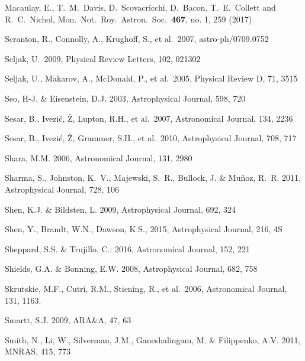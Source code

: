 \documentclass[twocolumn]{aastex61}
\begin{document}
\begin{thebibliography}{}
 Macaulay, E., T.~M.~Davis, D.~Scovacricchi, D.~Bacon, T.~E.~Collett and R.~C.~Nichol, Mon.\ Not.\ Roy.\ Astron.\ Soc.\  {\bf 467}, no. 1, 259 (2017)

 Scranton, R., Connolly, A., Krughoff, S., et al.~2007, astro-ph/0709.0752

 Seljak, U.\ 2009, Physical Review Letters, 102, 021302

 Seljak, U., Makarov, A., McDonald, P., et al.~2005,  Physical Review D, 71, 3515

 Seo, H-J. \& Eisenstein, D.J. 2003, Astrophysical Journal, 598, 720

 Sesar, B., Ivezi\'{c}, \v{Z}, Lupton, R.H., et al.~2007, Astronomical Journal, 134, 2236

 Sesar, B., Ivezi\'{c}, \v{Z}, Grammer, S.H., et al.~2010, Astrophysical Journal, 708, 717

 Shara, M.M. 2006, Astronomical Journal, 131, 2980

 Sharma, S., Johnston, K.~V., Majewski, S.~R., Bullock, J. \& Mu{\~n}oz, R.~R. 2011, Astrophysical Journal, 728, 106

 Shen, K.J. \& Bildsten, L. 2009, Astrophysical Journal, 692, 324

 Shen, Y., Brandt, W.N., Dawson, K.S., 2015, Astrophysical Journal, 216, 4S

 Sheppard, S.S.  \&  Trujillo, C.: 2016, Astronomical Journal, 152, 221

 Shields, G.A. \& Bonning, E.W. 2008, Astrophysical Journal, 682, 758

 Skrutskie, M.F., Cutri, R.M., Stiening, R., et al.~2006, Astronomical Journal, 131, 1163.

 Smartt, S.J. 2009, ARA\&A, 47, 63

 Smith, N., Li, W., Silverman, J.M., Ganeshalingam, M. \& Filippenko, A.V. 2011, MNRAS, 415, 773


\end{thebibliography}
\end{document}
